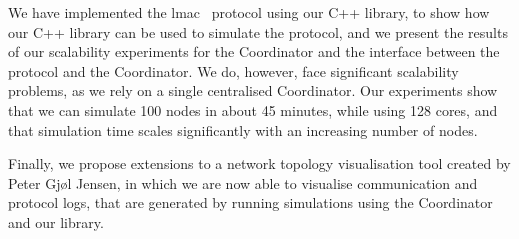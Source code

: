 We have implemented the \gls{lmac}~\cite{paper:lmac_protocol} protocol using our C++ library, to show how our
C++ library can be used to simulate the protocol, and we present the results of our scalability experiments
for the Coordinator and the interface between the protocol and the Coordinator. We do, however, face
significant scalability problems, as we rely on a single centralised Coordinator. Our experiments show that we
can simulate 100 nodes in about 45 minutes, while using 128 cores, and that simulation time scales
significantly with an increasing number of nodes. \medbreak

Finally, we propose extensions to a network topology visualisation tool created by Peter Gjøl Jensen, in which
we are now able to visualise communication and protocol logs, that are generated by running simulations using
the Coordinator and our library.